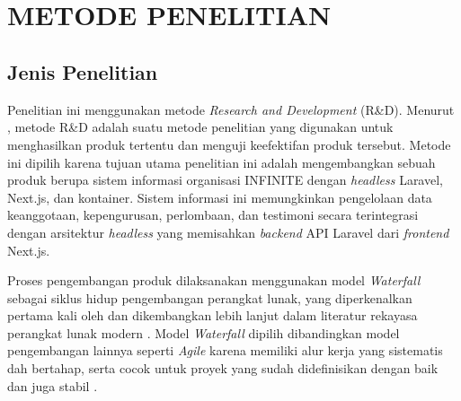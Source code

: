 
\chapter[METODE PENELITIAN]{\\ METODE PENELITIAN}

\section{Jenis Penelitian}

Penelitian ini menggunakan metode \textit{Research and Development} (R\&D). Menurut \citet{Sugiyono_2013_RnD}, metode R\&D adalah suatu metode penelitian yang digunakan untuk menghasilkan produk tertentu dan menguji keefektifan produk tersebut. Metode ini dipilih karena tujuan utama penelitian ini adalah mengembangkan sebuah produk berupa sistem informasi organisasi INFINITE dengan \textit{headless} Laravel, Next.js, dan kontainer.
Sistem informasi ini memungkinkan pengelolaan data keanggotaan, kepengurusan, perlombaan, dan testimoni secara terintegrasi dengan arsitektur \textit{headless} yang memisahkan \textit{backend} API Laravel dari \textit{frontend} Next.js.

Proses pengembangan produk dilaksanakan menggunakan model \textit{Waterfall} sebagai siklus hidup pengembangan perangkat lunak, yang diperkenalkan pertama kali oleh \citet{Royce_1970_Waterfall} dan dikembangkan lebih lanjut dalam literatur rekayasa perangkat lunak modern \citep{Pressman_2014_SE, Sommerville_2016_SE}. Model \textit{Waterfall} dipilih dibandingkan model pengembangan lainnya seperti \textit{Agile} karena memiliki alur kerja yang sistematis dah bertahap, serta cocok untuk proyek yang sudah didefinisikan dengan baik dan juga stabil \citep{Haniva_2023_Waterfall}.

